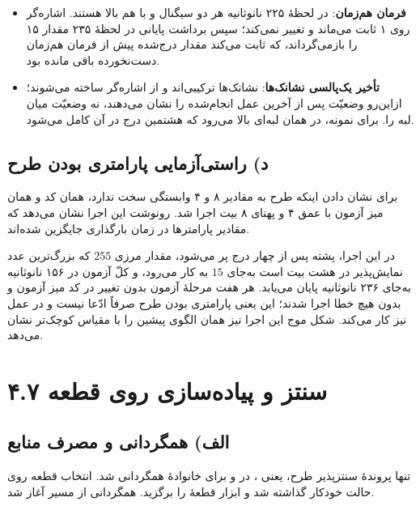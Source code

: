 \documentclass[12pt,a4paper]{article}
\begin{document}
\begin{itemize}
		\item \textbf{فرمان هم‌زمان}: در لحظهٔ ۲۲۵ نانوثانیه هر دو سیگنال  و  با هم بالا هستند. اشاره‌گر روی ۱ ثابت می‌ماند و  تغییر نمی‌کند؛ سپس برداشت پایانی در لحظهٔ ۲۳۵ مقدار ۱۵ را بازمی‌گرداند، که ثابت می‌کند مقدار درج‌شده پیش از فرمان هم‌زمان دست‌نخورده باقی مانده بود.
		\item \textbf{تأخیر یک‌پالسی نشانک‌ها}: نشانک‌ها ترکیبی‌اند و از اشاره‌گر ساخته می‌شوند؛ ازاین‌رو وضعیّت پس از آخرین عمل انجام‌شده را نشان می‌دهند، نه وضعیّت میان لبه را. برای نمونه،  در همان لبه‌ای بالا می‌رود که هشتمین درج در آن کامل می‌شود.
	\end{itemize}

	\subsection*{د) راستی‌آزمایی پارامتری بودن طرح}
	برای نشان دادن اینکه طرح به مقادیر ۸ و ۴ وابستگی سخت ندارد، همان کد و همان میز آزمون با عمق ۴ و پهنای ۸ بیت اجرا شد. رونوشت این اجرا نشان می‌دهد که مقادیر پارامترها در زمان بارگذاری جایگزین شده‌اند.



	در این اجرا، پشته پس از چهار درج پر می‌شود، مقدار مرزی \(255\) که بزرگ‌ترین عدد نمایش‌پذیر در هشت بیت است به‌جای \(15\) به کار می‌رود، و کلّ آزمون در ۱۵۶ نانوثانیه به‌جای ۲۳۶ نانوثانیه پایان می‌یابد. هر هفت مرحلهٔ آزمون بدون تغییر در کد میز آزمون و بدون هیچ خطا اجرا شدند؛ این یعنی پارامتری بودن طرح صرفاً ادّعا نیست و در عمل نیز کار می‌کند. شکل موج این اجرا نیز همان الگوی پیشین را با مقیاس کوچک‌تر نشان می‌دهد.


	\section*{۴.۷ سنتز و پیاده‌سازی روی قطعه}
	\subsection*{الف) همگردانی و مصرف منابع}
	تنها پروندهٔ سنتز‌پذیر طرح، یعنی ، در  و برای خانوادهٔ  همگردانی شد. انتخاب قطعه روی حالت خودکار گذاشته شد و ابزار قطعهٔ  را برگزید. همگردانی از مسیر  آغاز شد.
\end{document}
